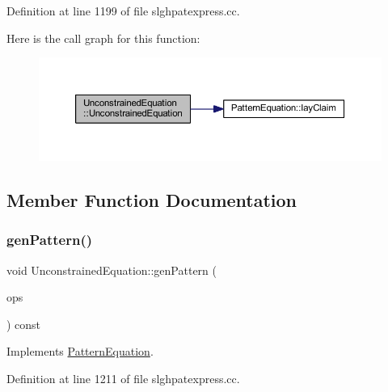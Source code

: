 Definition at line 1199 of file slghpatexpress.\+cc.

Here is the call graph for this function\+:
\nopagebreak
\begin{figure}[H]
\begin{center}
\leavevmode
\includegraphics[width=350pt]{class_unconstrained_equation_ade67efa8c6d6a3551ae0df0b3c8bf92e_cgraph}
\end{center}
\end{figure}


\subsection{Member Function Documentation}
\mbox{\label{class_unconstrained_equation_a6b6c824615f9de7fba284e940cb11299}} 
\subsubsection{\texorpdfstring{genPattern()}{genPattern()}}
{\footnotesize\ttfamily void Unconstrained\+Equation\+::gen\+Pattern (\begin{DoxyParamCaption}\item[{const vector$<$ \mbox{\hyperlink{class_token_pattern}{Token\+Pattern}} $>$ \&}]{ops }\end{DoxyParamCaption}) const\hspace{0.3cm}{\ttfamily [virtual]}}



Implements \mbox{\hyperlink{class_pattern_equation_a9838e5bfe5b6013c99567628a6364bfd}{Pattern\+Equation}}.



Definition at line 1211 of file slghpatexpress.\+cc.

